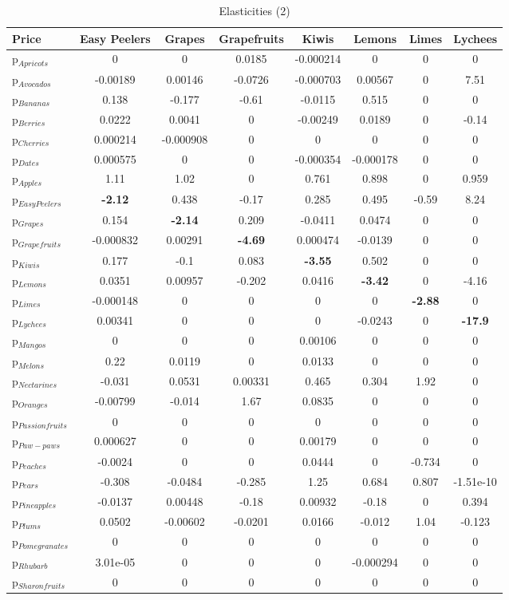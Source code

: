 \documentclass[11pt]{article}
\begin{document}
\begin{table}[h]
\caption{Elasticities (2)}
\label{table:elasticities 2}
\begin{center}
\begin{tabular}{lccccccc} \hline \hline
Price &Easy Peelers &Grapes &Grapefruits &Kiwis &Lemons &Limes &Lychees \\ \hline
p$_{Apricots}$ &0 &0 &0.0185 &-0.000214 &0 &0 &0 \\
p$_{Avocados}$ &-0.00189 &0.00146 &-0.0726 &-0.000703 &0.00567 &0 &7.51 \\
p$_{Bananas}$ &0.138 &-0.177 &-0.61 &-0.0115 &0.515 &0 &0 \\
p$_{Berries}$ &0.0222 &0.0041 &0 &-0.00249 &0.0189 &0 &-0.14 \\
p$_{Cherries}$ &0.000214 &-0.000908 &0 &0 &0 &0 &0 \\
p$_{Dates}$ &0.000575 &0 &0 &-0.000354 &-0.000178 &0 &0 \\
p$_{Apples}$ &1.11 &1.02 &0 &0.761 &0.898 &0 &0.959 \\
p$_{Easy Peelers}$ &\textbf{-2.12} &0.438 &-0.17 &0.285 &0.495 &-0.59 &8.24 \\
p$_{Grapes}$ &0.154 &\textbf{-2.14} &0.209 &-0.0411 &0.0474 &0 &0 \\
p$_{Grapefruits}$ &-0.000832 &0.00291 &\textbf{-4.69} &0.000474 &-0.0139 &0 &0 \\
p$_{Kiwis}$ &0.177 &-0.1 &0.083 &\textbf{-3.55} &0.502 &0 &0 \\
p$_{Lemons}$ &0.0351 &0.00957 &-0.202 &0.0416 &\textbf{-3.42} &0 &-4.16 \\
p$_{Limes}$ &-0.000148 &0 &0 &0 &0 &\textbf{-2.88} &0 \\
p$_{Lychees}$ &0.00341 &0 &0 &0 &-0.0243 &0 &\textbf{-17.9} \\
p$_{Mangos}$ &0 &0 &0 &0.00106 &0 &0 &0 \\
p$_{Melons}$ &0.22 &0.0119 &0 &0.0133 &0 &0 &0 \\
p$_{Nectarines}$ &-0.031 &0.0531 &0.00331 &0.465 &0.304 &1.92 &0 \\
p$_{Oranges}$ &-0.00799 &-0.014 &1.67 &0.0835 &0 &0 &0 \\
p$_{Passion fruits}$ &0 &0 &0 &0 &0 &0 &0 \\
p$_{Paw-paws}$ &0.000627 &0 &0 &0.00179 &0 &0 &0 \\
p$_{Peaches}$ &-0.0024 &0 &0 &0.0444 &0 &-0.734 &0 \\
p$_{Pears}$ &-0.308 &-0.0484 &-0.285 &1.25 &0.684 &0.807 &-1.51e-10 \\
p$_{Pineapples}$ &-0.0137 &0.00448 &-0.18 &0.00932 &-0.18 &0 &0.394 \\
p$_{Plums}$ &0.0502 &-0.00602 &-0.0201 &0.0166 &-0.012 &1.04 &-0.123 \\
p$_{Pomegranates}$ &0 &0 &0 &0 &0 &0 &0 \\
p$_{Rhubarb}$ &3.01e-05 &0 &0 &0 &-0.000294 &0 &0 \\
p$_{Sharon fruits}$ &0 &0 &0 &0 &0 &0 &0 \\
\end{tabular}
\end{center}
\end{table}
\end{document}
